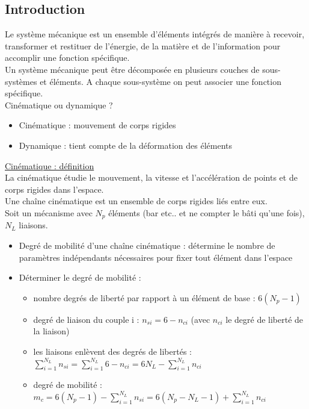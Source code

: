 \documentclass[../main.tex]{subfiles}
\begin{document}
\localtableofcontents

\subsection{Introduction}

Le système mécanique est un ensemble d'éléments intégrés de manière à recevoir, transformer et restituer de l'énergie, de la matière et de l'information pour accomplir une fonction spécifique.\\

Un système mécanique peut être décomposée en plusieurs couches de sous-systèmes et éléments. A chaque sous-système on peut associer une fonction spécifique.\\

Cinématique ou dynamique ? \begin{itemize}
    \item Cinématique : mouvement de corps rigides\\
    \item Dynamique : tient compte de la déformation des éléments\\
\end{itemize}

\quad \underline{Cinématique : définition}\\
La cinématique étudie le mouvement, la vitesse et l'accélération de points et de corps rigides dans l'espace.\\

Une chaîne cinématique est un ensemble de corps rigides liés entre eux.\\

Soit un mécanisme avec $N_p$ éléments (bar etc.. et ne compter le bâti qu'une fois), $N_L$ liaisons.\\

\begin{itemize}
    \item Degré de mobilité d'une chaîne cinématique : détermine le nombre de paramètres indépendants nécessaires pour fixer tout élément dans l'espace\\
    \item Déterminer le degré de mobilité : \begin{itemize}
        \item nombre degrés de liberté par rapport à un élément de base : $6(N_p-1)$\\
        \item degré de liaison du couple i : $n_{si} = 6-n_{ci}$ (avec $n_{ci}$ le degré de liberté de la liaison)\\
        \item les liaisons enlèvent des degrés de libertés : $\sum_{i=1}^{N_L} n_{si}= \sum_{i=1}^{N_L}6-n_{ci} = 6N_L - \sum_{i=1}^{N_L} n_{ci}$\\
        \item degré de mobilité : $m_c = 6(N_p-1)-\sum_{i=1}^{N_L} n_{si} = 6(N_p-N_L-1) + \sum_{i=1}^{N_L} n_{ci}$\\
    \end{itemize}
\end{itemize}
\end{document}
